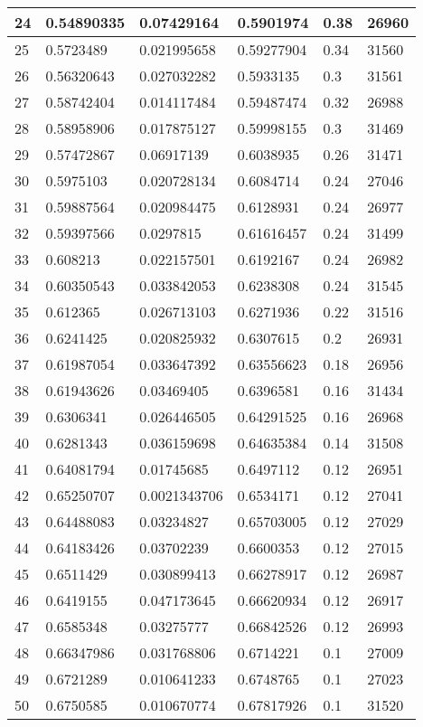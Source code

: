 \begin{longtable}{|l|l|l|l|l|l|}
24 & 0.54890335 & 0.07429164 & 0.5901974 & 0.38 & 26960 \\ \hline 
25 & 0.5723489 & 0.021995658 & 0.59277904 & 0.34 & 31560 \\ \hline 
26 & 0.56320643 & 0.027032282 & 0.5933135 & 0.3 & 31561 \\ \hline 
27 & 0.58742404 & 0.014117484 & 0.59487474 & 0.32 & 26988 \\ \hline 
28 & 0.58958906 & 0.017875127 & 0.59998155 & 0.3 & 31469 \\ \hline 
29 & 0.57472867 & 0.06917139 & 0.6038935 & 0.26 & 31471 \\ \hline 
30 & 0.5975103 & 0.020728134 & 0.6084714 & 0.24 & 27046 \\ \hline 
31 & 0.59887564 & 0.020984475 & 0.6128931 & 0.24 & 26977 \\ \hline 
32 & 0.59397566 & 0.0297815 & 0.61616457 & 0.24 & 31499 \\ \hline 
33 & 0.608213 & 0.022157501 & 0.6192167 & 0.24 & 26982 \\ \hline 
34 & 0.60350543 & 0.033842053 & 0.6238308 & 0.24 & 31545 \\ \hline 
35 & 0.612365 & 0.026713103 & 0.6271936 & 0.22 & 31516 \\ \hline 
36 & 0.6241425 & 0.020825932 & 0.6307615 & 0.2 & 26931 \\ \hline 
37 & 0.61987054 & 0.033647392 & 0.63556623 & 0.18 & 26956 \\ \hline 
38 & 0.61943626 & 0.03469405 & 0.6396581 & 0.16 & 31434 \\ \hline 
39 & 0.6306341 & 0.026446505 & 0.64291525 & 0.16 & 26968 \\ \hline 
40 & 0.6281343 & 0.036159698 & 0.64635384 & 0.14 & 31508 \\ \hline 
41 & 0.64081794 & 0.01745685 & 0.6497112 & 0.12 & 26951 \\ \hline 
42 & 0.65250707 & 0.0021343706 & 0.6534171 & 0.12 & 27041 \\ \hline 
43 & 0.64488083 & 0.03234827 & 0.65703005 & 0.12 & 27029 \\ \hline 
44 & 0.64183426 & 0.03702239 & 0.6600353 & 0.12 & 27015 \\ \hline 
45 & 0.6511429 & 0.030899413 & 0.66278917 & 0.12 & 26987 \\ \hline 
46 & 0.6419155 & 0.047173645 & 0.66620934 & 0.12 & 26917 \\ \hline 
47 & 0.6585348 & 0.03275777 & 0.66842526 & 0.12 & 26993 \\ \hline 
48 & 0.66347986 & 0.031768806 & 0.6714221 & 0.1 & 27009 \\ \hline 
49 & 0.6721289 & 0.010641233 & 0.6748765 & 0.1 & 27023 \\ \hline 
50 & 0.6750585 & 0.010670774 & 0.67817926 & 0.1 & 31520 \\ \hline 
\end{longtable}
